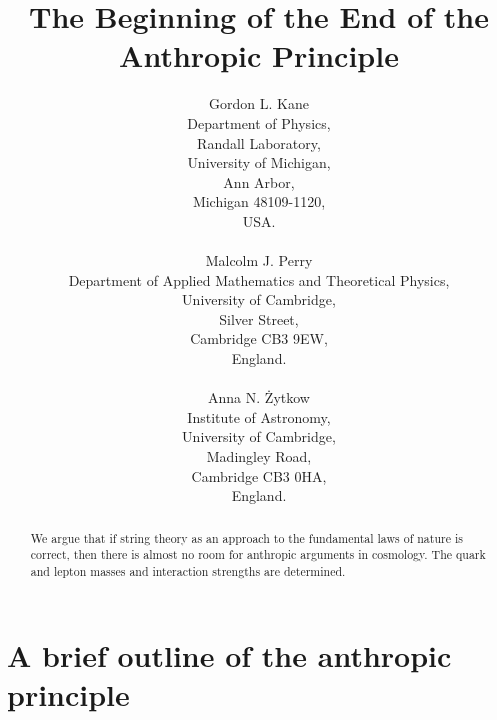 \documentclass{article}
\begin{document}
\title{The Beginning of the End of the Anthropic Principle}
\author{Gordon L. Kane\\
Department of Physics,\\
Randall Laboratory,\\
University of Michigan,\\
Ann Arbor,\\
Michigan 48109-1120,\\
USA.\\ \\
Malcolm J. Perry\\
Department of Applied Mathematics and Theoretical Physics,\\
University of Cambridge,\\
Silver Street,\\
Cambridge CB3 9EW,\\ England.\\ \\
Anna N. \.Zytkow\\
Institute of Astronomy,\\
University of Cambridge,\\
Madingley Road,\\
Cambridge CB3 0HA,\\
England.}
\maketitle
\begin{abstract}
We argue that if string theory as an approach to the fundamental laws of
nature
is correct, then there is almost no room for anthropic arguments in
cosmology.  The quark and lepton masses and interaction strengths are
determined.
\end{abstract}
\vfill
\eject
\section{A brief outline of the anthropic principle}
\end{document}
